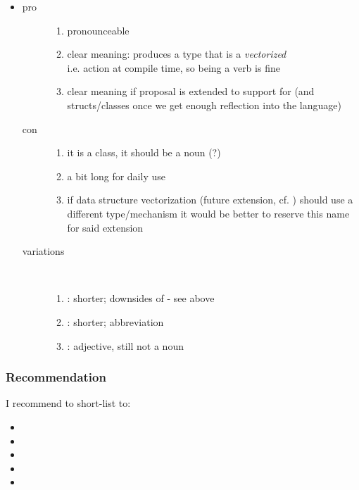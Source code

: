 \begin{itemize}
  \item {}
    \begin{description}
      \item[pro]
        \begin{enumerate}
          \item pronounceable
          \item clear meaning: produces a type that is a \emph{vectorized} \\
            i.e. action at compile time, so being a verb is fine
          \item clear meaning if proposal is extended to support  for  (and structs/classes once we get enough reflection into the language)
        \end{enumerate}
      \item[con]
        \begin{enumerate}
          \item it is a class, it should be a noun (?)
          \item a bit long for daily use
          \item if data structure vectorization (future extension, cf. \cite{Kretz2015}) should use a different type/mechanism it would be better to reserve this name for said extension
        \end{enumerate}
      \item[variations]\ 
        \begin{enumerate}
          \item {}: shorter; downsides of  - see above
          \item \code{vectize<T>}: shorter; abbreviation
          \item {}: adjective, still not a noun
        \end{enumerate}
    \end{description}
\end{itemize}

\subsubsection{Recommendation}
I recommend to short-list to:
\begin{itemize}
  \item {}
  \item {}
  \item \code{simd<T>}
  \item {}
  \item {}
\end{itemize}


